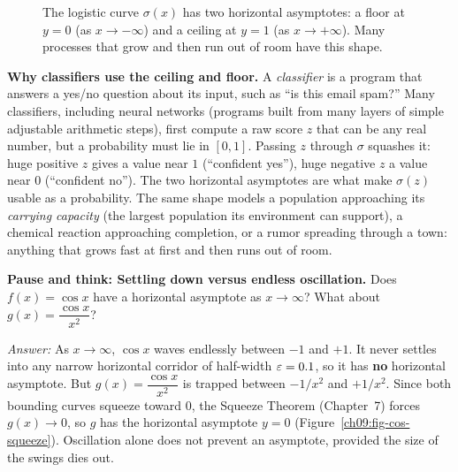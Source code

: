 \begin{figure}[htbp]
\centering
{}
\caption{The logistic curve $\sigma(x)$ has two horizontal asymptotes: a floor
at $y=0$ (as $x\to-\infty$) and a ceiling at $y=1$ (as $x\to+\infty$). Many
processes that grow and then run out of room have this shape.}
\label{ch09:fig-logistic}
\end{figure}

\begin{applicationbox}
\textbf{Why classifiers use the ceiling and floor.} A \emph{classifier} is a
program that answers a yes/no question about its input, such as ``is this email
spam?'' Many classifiers, including neural networks (programs built from many
layers of simple adjustable arithmetic steps), first compute a
raw score $z$ that can be any real number, but a probability must lie in
$[0,1]$. Passing $z$ through $\sigma$ squashes it: huge positive $z$ gives a
value near $1$ (``confident yes''), huge negative $z$ a value near $0$ (``confident
no''). The two horizontal asymptotes are what make $\sigma(z)$ usable as a
probability. The same shape models a population approaching its \emph{carrying
capacity} (the largest population its environment can support), a chemical
reaction approaching completion, or a rumor spreading through a
town: anything that grows fast at first and then runs out of room.
\end{applicationbox}

\begin{recoverybox}
\textbf{Pause and think: Settling down versus endless oscillation.} Does
$f(x) = \cos x$ have a horizontal asymptote as $x\to\infty$? What about
$g(x) = \dfrac{\cos x}{x^2}$?

\emph{Answer:} As $x\to\infty$, $\cos x$ waves endlessly between $-1$ and $+1$.
It never settles into any narrow horizontal corridor of half-width $\varepsilon=0.1$,
so it has \textbf{no} horizontal asymptote. But $g(x)=\dfrac{\cos x}{x^2}$ is
trapped between $-1/x^2$ and $+1/x^2$. Since both bounding
curves squeeze toward $0$, the Squeeze Theorem (Chapter~7) forces $g(x)\to 0$,
so $g$ has the horizontal asymptote
$y=0$ (Figure~\ref{ch09:fig-cos-squeeze}). Oscillation alone does not prevent
an asymptote, provided the size of the swings dies out.
\end{recoverybox}

